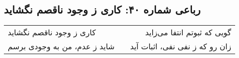 \begin{center}
\section*{رباعی شماره ۴۰: کاری ز وجود ناقصم نگشاید}
\label{sec:040}
\begin{longtable}{l p{0.5cm} r}
کاری ز وجود ناقصم نگشاید
&&
گویی که ثبوتم انتفا می‌زاید
\\
شاید ز عدم، من به وجودی برسم
&&
زان رو که ز نفی نفی، اثبات آید
\\
\end{longtable}
\end{center}
